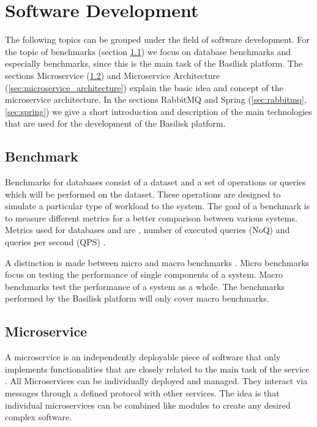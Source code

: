 \section{Software Development}
\label{sec:software_dev}
The following topics can be grouped under the field of software development.
For the topic of benchmarks (section \ref{sec:benchmark}) we focus on database benchmarks and especially \ts{} benchmarks, since this is the main task of the Basilisk platform.
The sections Microservice (\ref{sec:microservice}) and Microservice Architecture (\ref{sec:microservice_architecture}) explain the basic idea and concept of the microservice architecture.
In the sections RabbitMQ and Spring (\ref{sec:rabbitmq}, \ref{sec:spring}) we give a short introduction and description of the main technologies that are used for the development of the Basilisk platform.

\subsection{Benchmark}
\label{sec:benchmark}
Benchmarks for databases consist of a dataset and a set of operations or queries which will be performed on the dataset.
These operations are designed to simulate a particular type of workload to the system.
The goal of a benchmark is to measure different metrics for a better comparison between various systems.
Metrics used for databases and \tsp{} are \eg, number of executed queries (NoQ) and queries per second (QPS) \cite{IguanaDocsMetrics}.

A distinction is made between micro and macro benchmarks \cite{gibbsMicrobenchmarksVsMacrobenchmarks}.
Micro benchmarks focus on testing the performance of single components of a system.
Macro benchmarks test the performance of a system as a whole.
The benchmarks performed by the Basilisk platform will only cover macro benchmarks.

\subsection{Microservice}
\label{sec:microservice}
A microservice is an independently deployable piece of software that only implements functionalities that are closely related to the main task of the service \cite{dragoniMicroservicesYesterdayToday2017}.
All Microservices can be individually deployed and managed.
They interact via messages through a defined protocol with other services.
The idea is that individual microservices can be combined like modules to create any desired complex software.


